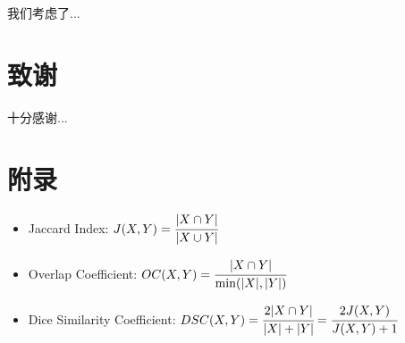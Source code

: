 \documentclass[UTF8,12pt]{ctexart}
\begin{document}
    我们考虑了...

\newpage
{}


\newpage
\section{致谢}

    十分感谢...

\newpage
\section{附录}

    \begin{itemize}
        \item Jaccard Index: $J(X,Y)=\cfrac{| X\cap Y |}{| X\cup Y |}$
        \item Overlap Coefficient: $OC(X,Y)=\cfrac{| X\cap Y |}{\min(|X|,|Y|)}$
        \item Dice Similarity Coefficient: $DSC(X,Y)=\cfrac{2| X\cap Y |}{|X|+|Y|}=\cfrac{2J(X,Y)}{J(X,Y)+1}$
    \end{itemize}
\end{document}
